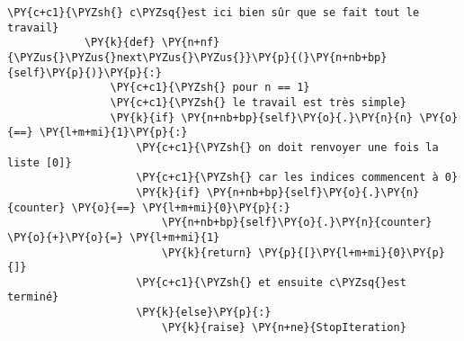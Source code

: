 \begin{Verbatim}[commandchars=\\\{\}]
            \PY{c+c1}{\PYZsh{} c\PYZsq{}est ici bien sûr que se fait tout le travail}
            \PY{k}{def} \PY{n+nf}{\PYZus{}\PYZus{}next\PYZus{}\PYZus{}}\PY{p}{(}\PY{n+nb+bp}{self}\PY{p}{)}\PY{p}{:}
                \PY{c+c1}{\PYZsh{} pour n == 1}
                \PY{c+c1}{\PYZsh{} le travail est très simple}
                \PY{k}{if} \PY{n+nb+bp}{self}\PY{o}{.}\PY{n}{n} \PY{o}{==} \PY{l+m+mi}{1}\PY{p}{:}
                    \PY{c+c1}{\PYZsh{} on doit renvoyer une fois la liste [0]}
                    \PY{c+c1}{\PYZsh{} car les indices commencent à 0}
                    \PY{k}{if} \PY{n+nb+bp}{self}\PY{o}{.}\PY{n}{counter} \PY{o}{==} \PY{l+m+mi}{0}\PY{p}{:} 
                        \PY{n+nb+bp}{self}\PY{o}{.}\PY{n}{counter} \PY{o}{+}\PY{o}{=} \PY{l+m+mi}{1}
                        \PY{k}{return} \PY{p}{[}\PY{l+m+mi}{0}\PY{p}{]}
                    \PY{c+c1}{\PYZsh{} et ensuite c\PYZsq{}est terminé}
                    \PY{k}{else}\PY{p}{:}
                        \PY{k}{raise} \PY{n+ne}{StopIteration}
        

\end{Verbatim}
